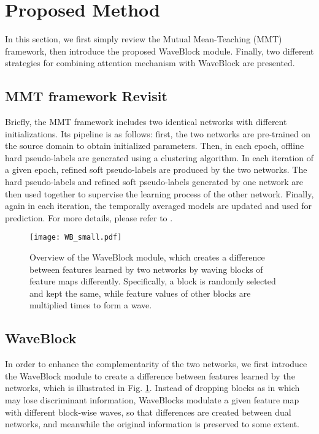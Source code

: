 \documentclass[journal]{IEEEtran}
\begin{document}
\section{Proposed Method}
In this section, we first simply review the Mutual Mean-Teaching (MMT) framework, then introduce the proposed WaveBlock module. Finally, two different strategies for combining attention mechanism with WaveBlock are presented.

\subsection{MMT framework Revisit}
Briefly, the MMT framework includes two identical networks with different initializations. Its pipeline is as follows: first, the two networks are pre-trained on the source domain to obtain initialized parameters. Then, in each epoch, offline hard pseudo-labels are generated using a clustering algorithm. In each iteration of a given epoch, refined soft pseudo-labels are produced by the two networks. The hard pseudo-labels and refined soft pseudo-labels generated by one network are then used together to supervise the learning process of the other network. Finally, again in each iteration, the temporally averaged models are updated and used for prediction. For more details, please refer to \cite{ge2020mutual}.
\begin{figure}
\centering
\texttt{[image: WB\_small.pdf]}
\caption{Overview of the WaveBlock module, which creates a difference between features learned by two networks by waving blocks of feature maps differently. Specifically, a block is randomly selected and kept the same, while feature values of other blocks are multiplied  times to form a wave.}
\label{WB}
\end{figure}
\subsection{WaveBlock}
In order to enhance the complementarity of the two networks, we first introduce the WaveBlock module to create a difference  between features learned by the networks, which is illustrated in Fig. \ref{WB}. Instead of dropping blocks as in \cite{ghiasi2018dropblock} which may lose discriminant information, WaveBlocks modulate a given feature map with different block-wise waves, so that differences are created between dual networks, and meanwhile the original information is preserved to some extent.\par 
\end{document}
